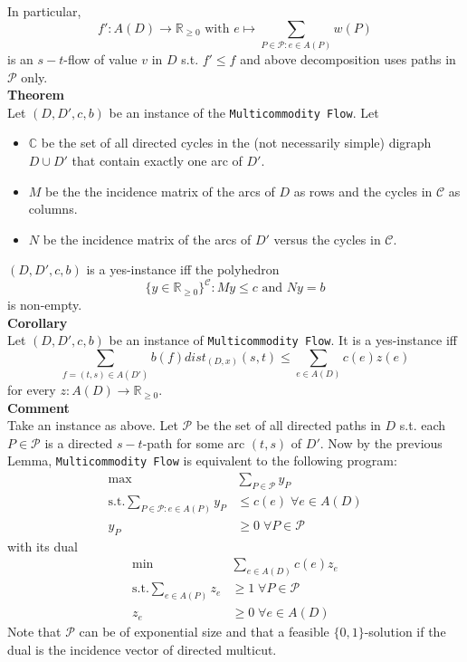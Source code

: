 \documentclass[a4paper, 12pt]{article}
\begin{document}
	In particular, \[f': A(D) \to \mathbb{R}_{\geq 0} \text{ with } e\mapsto \sum_{P \in \mathcal{P}: e \in A(P)} w(P)\]
	is an $s-t$-flow of value $v$ in $D$ s.t. $f' \leq f$ and above decomposition uses paths in $\mathcal{P}$ only.\\
	\textbf{Theorem}\\
	Let $(D, D', c, b)$ be an instance of the \texttt{Multicommodity Flow}. Let \begin{itemize}
		\item $\mathbb{C}$ be the set of all directed cycles in the (not necessarily simple) digraph $D \cup D'$ that contain exactly one arc of $D'$. 
		\item $M$ be the the incidence matrix of the arcs of $D$ as rows and the cycles in $\mathcal{C}$ as columns.
		\item $N$ be the incidence matrix of the arcs of $D'$ versus the cycles in $\mathcal{C}$.
	\end{itemize}
	$(D,D',c,b)$ is a yes-instance iff the polyhedron \[\{y \in \mathbb{R}_{\geq 0}\}^\mathcal{C}: My \leq c \text{ and } Ny = b\] is non-empty.\\
	\textbf{Corollary}\\
	Let $(D,D',c,b)$ be an instance of \texttt{Multicommodity Flow}. It is a yes-instance iff \[\sum_{f = (t,s)\in A(D')} b(f)dist_(D,x)(s,t) \leq \sum_{e \in A(D)} c(e)z(e)\] for every $z: A(D) \to \mathbb{R}_{\geq 0}$.\\
	\textbf{Comment}\\
	Take an instance as above. Let $\mathcal{P}$ be the set of all directed paths in $D$ s.t. each $P \in \mathcal{P}$ is a directed $s-t$-path for some arc $(t,s)$ of $D'$. Now by the previous Lemma, \texttt{Multicommodity Flow} is equivalent to the following program: \begin{align*}
		\max &\sum_{P \in \mathcal{P}} y_P\\
		\text{s.t.} \sum_{P \in \mathcal{P}: e \in A(P)} y_P &\leq c(e) \; \forall e \in A(D)\\
		y_P &\geq 0 \; \forall P \in \mathcal{P}
	\end{align*}
	with its dual \begin{align*}
		\min &\sum_{e \in A(D)} c(e)z_e\\
		\text{s.t.} \sum_{e \in A(P)} z_e & \geq 1 \; \forall P \in \mathcal{P}\\
		z_e &\geq 0 \; \forall e \in A(D)
	\end{align*}
	Note that $\mathcal{P}$ can be of exponential size and that a feasible $\{0,1\}$-solution if the dual is the incidence vector of directed multicut.\\
\end{document}
